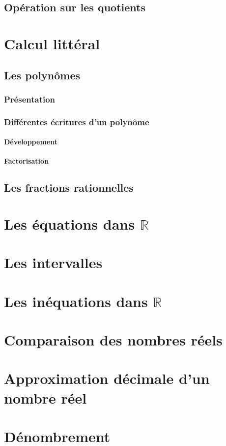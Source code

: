 \documentclass[12pt,a4paper]{book}
\begin{document}
\section{Opération sur les quotients}

\chapter{Calcul littéral}
\section{Les polynômes}
\subsection{Présentation}
\subsection{Différentes écritures d'un polynôme}
\subsubsection{Développement}
\subsubsection{Factorisation}
\section{Les fractions rationnelles}
\chapter{Les équations dans $\mathbb{R}$}
\chapter{Les intervalles}
\chapter{Les inéquations dans $\mathbb{R}$}
\chapter{Comparaison des nombres réels}
\chapter{Approximation décimale d'un nombre réel}
\chapter{Dénombrement}
\end{document}
